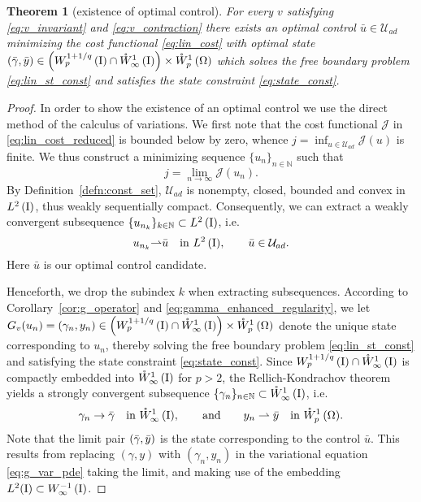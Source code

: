 \documentclass[final]{siamltex}
\newtheorem{thm}[theorem]{Theorem}
\begin{document}
\begin{thm}[existence of optimal control] \label{thm:oc_rc_existence}
For every $v$ satisfying \eqref{eq:v_invariant} and \eqref{eq:v_contraction} there exists an optimal control 
${\bar{u}}\in {{\mathcal{U}_{ad}}}$ minimizing
the cost functional \eqref{eq:lin_cost} with optimal state 
$({\bar{\gamma}},{\bar{y}}) \in \left( {{W^{{1+1/q}}_{{p}}\del{\text{\rm I}}}} \cap {{\mathring{W}^{{1}}_{{\infty}}\del{{\text{\rm I}}}}} \right) \times {{\mathring{W}^{{1}}_{{p}}\del{{\Omega}}}}$ which
solves the free boundary problem \eqref{eq:lin_st_const} and satisfies the state 
constraint \eqref{eq:state_const}.
\end{thm}
\begin{proof}
In order to show the existence of an optimal control we use the direct method of the calculus of variations. We first 
note that the cost functional ${\mathcal{J}}$ in \eqref{eq:lin_cost_reduced}
is bounded below by zero, whence $j = \inf_{u \in {{\mathcal{U}_{ad}}}} {\mathcal{J}}(u)$ is finite. We thus construct a minimizing sequence
$\{ u_n \}_{n\in \mathbb{N}}$ such that
	\[
  		j = \lim_{n\rightarrow \infty} {\mathcal{J}}(u_n).
	\]  
By Definition~\ref{defn:const_set}, ${{\mathcal{U}_{ad}}}$ is nonempty, closed, bounded
and convex in ${{L^2\del{{\text{\rm I}}}}}$, thus weakly sequentially compact. Consequently,
we can extract a weakly convergent subsequence $\{ u_{n_k} \}_{k \in \mathbb{N}} \subset {{L^2\del{{\text{\rm I}}}}}$, i.e.
	\[
     		u_{n_k} {\rightharpoonup} {\bar{u}}  \quad {{\textnormal{{in }}}} {{L^2\del{{\text{\rm I}}}}}, \qquad {\bar{u}} \in {{\mathcal{U}_{ad}}}.
	\]
Here ${\bar{u}}$ is our optimal control candidate. 

Henceforth, we drop the subindex $k$ when extracting subsequences. 
According to Corollary~\ref{cor:g_operator} and \eqref{eq:gamma_enhanced_regularity},
we let $G_v(u_n) = (\gamma_n,y_n)\in \left( {{W^{{1+1/q}}_{{p}}\del{\text{\rm I}}}} \cap {{\mathring{W}^{{1}}_{{\infty}}\del{{\text{\rm I}}}}} \right) \times {{\mathring{W}^{{1}}_{{p}}\del{{\Omega}}}}$ denote the unique state corresponding to $u_n$, thereby  solving the free boundary problem 
\eqref{eq:lin_st_const} and satisfying the state constraint \eqref{eq:state_const}. Since 
${{W^{{1+1/q}}_{{p}}\del{\text{\rm I}}}} \cap {{\mathring{W}^{{1}}_{{\infty}}\del{{\text{\rm I}}}}} $ is compactly
embedded into ${{\mathring{W}^{{1}}_{{\infty}}\del{{\text{\rm I}}}}}$ for $p>2$,
the Rellich-Kondrachov theorem yields a strongly convergent subsequence 
$\{ \gamma_{n} \}_{n\in \mathbb{N}} \subset {{\mathring{W}^{{1}}_{{\infty}}\del{{\text{\rm I}}}}}$, i.e. 
	\[
     		\gamma_n \to  {\bar{\gamma}} \quad {{\textnormal{{in }}}} {{\mathring{W}^{{1}}_{{\infty}}\del{{\text{\rm I}}}}}, \qquad {{\textnormal{{and}}}} \qquad
     		y_n \rightharpoonup  {\bar{y}} \quad {{\textnormal{{in }}}} {{\mathring{W}^{{1}}_{{p}}\del{{\Omega}}}} .
	\]
Note that the limit pair $\del{{\bar{\gamma}}, {\bar{y}}}$ is the state corresponding to the control ${\bar{u}}$. This results from replacing 
$(\gamma,y)$ with $(\gamma_n,y_n)$
in the variational equation \eqref{eq:g_var_pde} taking the limit, and making use of the embedding $L^2({\text{\rm I}}) \subset {{W^{{-1}}_{{\infty}}\del{\text{\rm I}}}}$.


\end{proof}
\end{document}
